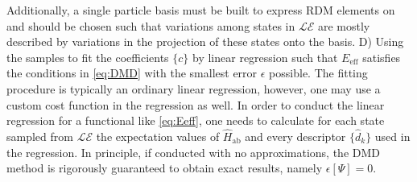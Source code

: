 \documentclass{article}
\begin{document}
Additionally, a single particle basis must be built to express RDM elements on and should be chosen such that variations among states in $\mathcal{LE}$ are mostly described by variations in the projection of these states onto the basis.
D) Using the samples to fit the coefficients $\{c\}$ by linear regression such that $E_\text{eff}$ satisfies the conditions in \eqref{eq:DMD} with the smallest error $\epsilon$ possible. 
The fitting procedure is typically an ordinary linear regression, however, one may use a custom cost function in the regression as well. 
In order to conduct the linear regression for a functional like \eqref{eq:Eeff}, one needs to calculate for each state sampled from $\mathcal{LE}$ the expectation values of $\hat{H}_\text{ab}$ and every descriptor $\{\hat{d}_k\}$ used in the regression.
In principle, if conducted with no approximations, the DMD method is rigorously guaranteed to obtain exact results, namely $\epsilon[\Psi] = 0$.
\end{document}
